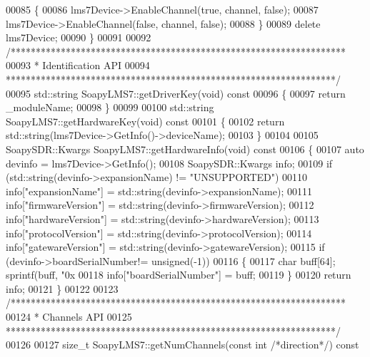 \begin{DoxyCode}
{{{{00085     \{
00086         lms7Device->EnableChannel(\textcolor{keyword}{true}, channel, \textcolor{keyword}{false});
00087         lms7Device->EnableChannel(\textcolor{keyword}{false}, channel, \textcolor{keyword}{false});
00088     \}
00089     \textcolor{keyword}{delete} lms7Device;
00090 \}
00091 
00092 \textcolor{comment}{/*******************************************************************}
00093 \textcolor{comment}{ * Identification API}
00094 \textcolor{comment}{ ******************************************************************/}
00095 std::string SoapyLMS7::getDriverKey(\textcolor{keywordtype}{void})\textcolor{keyword}{ const}
00096 \textcolor{keyword}{}\{
00097     \textcolor{keywordflow}{return} _moduleName;
00098 \}
00099 
00100 std::string SoapyLMS7::getHardwareKey(\textcolor{keywordtype}{void})\textcolor{keyword}{ const}
00101 \textcolor{keyword}{}\{
00102     \textcolor{keywordflow}{return} std::string(lms7Device->GetInfo()->deviceName);
00103 \}
00104 
00105 SoapySDR::Kwargs SoapyLMS7::getHardwareInfo(\textcolor{keywordtype}{void})\textcolor{keyword}{ const}
00106 \textcolor{keyword}{}\{
00107     \textcolor{keyword}{auto} devinfo = lms7Device->GetInfo();
00108     SoapySDR::Kwargs info;
00109     \textcolor{keywordflow}{if} (std::string(devinfo->expansionName) != \textcolor{stringliteral}{"UNSUPPORTED"})
00110         info[\textcolor{stringliteral}{"expansionName"}] = std::string(devinfo->expansionName);
00111     info[\textcolor{stringliteral}{"firmwareVersion"}] = std::string(devinfo->firmwareVersion);
00112     info[\textcolor{stringliteral}{"hardwareVersion"}] = std::string(devinfo->hardwareVersion);
00113     info[\textcolor{stringliteral}{"protocolVersion"}] = std::string(devinfo->protocolVersion);
00114     info[\textcolor{stringliteral}{"gatewareVersion"}] = std::string(devinfo->gatewareVersion);
00115     \textcolor{keywordflow}{if} (devinfo->boardSerialNumber!= \textcolor{keywordtype}{unsigned}(-1))
00116     \{
00117         \textcolor{keywordtype}{char} buff[64]; sprintf(buff, \textcolor{stringliteral}{"0x%
00118         info[\textcolor{stringliteral}{"boardSerialNumber"}] = buff;
00119     \}
00120     \textcolor{keywordflow}{return} info;
00121 \}
00122 
00123 \textcolor{comment}{/*******************************************************************}
00124 \textcolor{comment}{ * Channels API}
00125 \textcolor{comment}{ ******************************************************************/}
00126 
00127 \textcolor{keywordtype}{size\_t} SoapyLMS7::getNumChannels(\textcolor{keyword}{const} \textcolor{keywordtype}{int} \textcolor{comment}{/*direction*/})\textcolor{keyword}{ const}
}}}}}
\end{DoxyCode}
